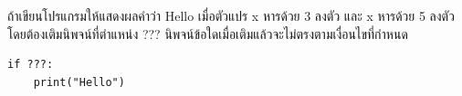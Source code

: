 ﻿%
\question ถ้าเขียนโปรแกรมให้แสดงผลคำว่า Hello เมื่อตัวแปร x หารด้วย 3 ลงตัว และ x หารด้วย 5 ลงตัว โดยต้องเติมนิพจน์ที่ตำแหน่ง ??? นิพจน์ข้อใดเมื่อเติมแล้วจะไม่ตรงตามเงื่อนไขที่กำหนด
\begin{verbatim}
if ???:
    print("Hello")
\end{verbatim}
